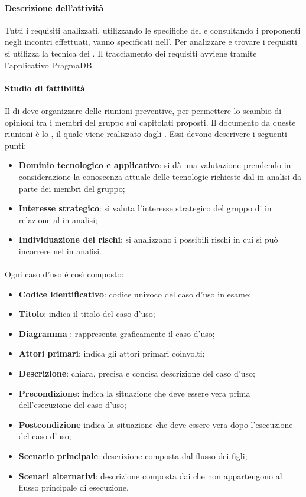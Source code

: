  \paragraph{Descrizione dell'attività}
 Tutti i requisiti analizzati, utilizzando le specifiche del  e consultando i proponenti negli
incontri effettuati, vanno specificati nell'\ARdocRR. Per analizzare e trovare i
requisiti si utilizza la tecnica dei . Il tracciamento dei requisiti avviene tramite l'applicativo PragmaDB.
 \paragraph{Studio di fattibilità}
 Il \RESP{} di  deve organizzare delle riunioni preventive, per permettere lo scambio
di opinioni tra i membri del gruppo sui capitolati proposti. Il documento  da queste
riunioni è lo \SFdocRR , il quale viene realizzato dagli \ANP{}. Essi devono
descrivere i seguenti punti: 
\begin{itemize}
 \item \textbf{Dominio tecnologico e applicativo}: si dà una valutazione prendendo in   considerazione
 la conoscenza attuale delle tecnologie richieste dal  in analisi da parte dei membri  
del gruppo;
 \item \textbf{Interesse strategico}: si valuta l'interesse strategico del gruppo di  in relazione
al  in analisi;
 \item \textbf{Individuazione dei rischi}: si analizzano i possibili rischi in cui si può incorrere nel
 in analisi.
\end{itemize}
 \paragraph{}
 Ogni caso d'uso è così composto:
 \begin{itemize}
  \item \textbf{Codice identificativo}: codice univoco del caso d'uso in esame;
  \item \textbf{Titolo}: indica il titolo del caso d'uso;
  \item \textbf{Diagramma }: rappresenta graficamente il caso d'uso;
  \item \textbf{Attori primari}: indica gli attori primari coinvolti;
  \item \textbf{Descrizione}: chiara, precisa e concisa descrizione del caso d'uso;
  \item \textbf{Precondizione}: indica la situazione che deve essere vera prima dell'esecuzione del caso d'uso;
  \item \textbf{Postcondizione} indica la situazione che deve essere vera dopo l'esecuzione del caso d'uso;
  \item \textbf{Scenario principale}: descrizione composta dal flusso dei  figli;
  \item \textbf{Scenari alternativi}: descrizione composta dai  che non appartengono al flusso
principale di esecuzione.
 \end{itemize}
